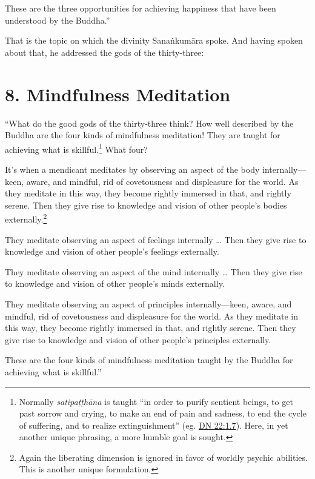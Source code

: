 \documentclass[12pt,openany]{book}%
\begin{document}
These are the three opportunities for achieving happiness that have been understood by the Buddha.” 

That is the topic on which the divinity \textsanskrit{Sanaṅkumāra} spoke. And having spoken about that, he addressed the gods of the thirty-three: 

\section*{8. Mindfulness Meditation }

“What do the good gods of the thirty-three think? How well described by the Buddha are the four kinds of mindfulness meditation! They are taught for achieving what is skillful.\footnote{Normally \textit{\textsanskrit{satipaṭṭhāna}} is taught “in order to purify sentient beings, to get past sorrow and crying, to make an end of pain and sadness, to end the cycle of suffering, and to realize extinguishment” (eg. \href{https://suttacentral.net/dn22/en/sujato\#1.7}{DN 22:1.7}). Here, in yet another unique phrasing, a more humble goal is sought. } What four? 

It’s when a mendicant meditates by observing an aspect of the body internally—keen, aware, and mindful, rid of covetousness and displeasure for the world. As they meditate in this way, they become rightly immersed in that, and rightly serene. Then they give rise to knowledge and vision of other people’s bodies externally.\footnote{Again the liberating dimension is ignored in favor of worldly psychic abilities. This is another unique formulation. } 

They meditate observing an aspect of feelings internally … Then they give rise to knowledge and vision of other people’s feelings externally. 

They meditate observing an aspect of the mind internally … Then they give rise to knowledge and vision of other people’s minds externally. 

They meditate observing an aspect of principles internally—keen, aware, and mindful, rid of covetousness and displeasure for the world. As they meditate in this way, they become rightly immersed in that, and rightly serene. Then they give rise to knowledge and vision of other people’s principles externally. 

These are the four kinds of mindfulness meditation taught by the Buddha for achieving what is skillful.” 
\end{document}
